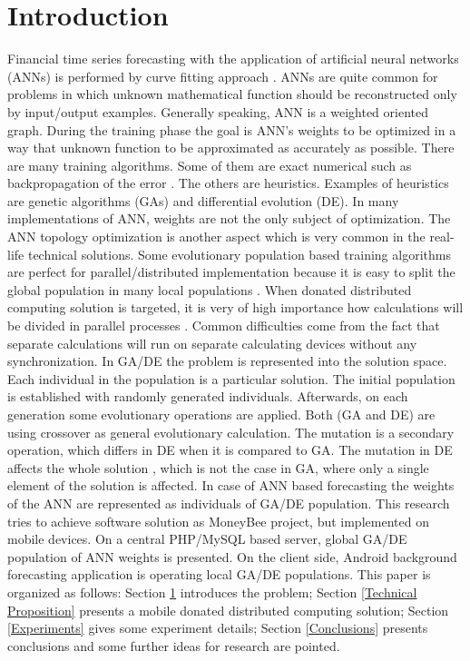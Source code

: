 \documentclass{llncs}
\begin{document}

\section{Introduction} \label{Introduction}

Financial time series forecasting with the application of artificial neural networks (ANNs) is performed by curve fitting approach \cite{atanasova01}. ANNs are quite common for problems in which unknown mathematical function should be reconstructed only by input/output examples. Generally speaking, ANN is a weighted oriented graph. During the training phase the goal is ANN's weights to be optimized in a way that unknown function to be approximated as accurately as possible. There are many training algorithms. Some of them are exact numerical such as backpropagation of the error \cite{zankinski01}. The others are heuristics. Examples of heuristics are genetic algorithms (GAs) and differential evolution (DE). In many implementations of ANN, weights are not the only subject of optimization. The ANN topology optimization \cite{zankinski02} is another aspect which is very common in the real-life technical solutions. Some evolutionary population based training algorithms are perfect for parallel/distributed implementation because it is easy to split the global population in many local populations \cite{balabanov03}. When donated distributed computing solution is targeted, it is very of high importance how calculations will be divided in parallel processes \cite{balabanov04}. Common difficulties come from the fact that separate calculations will run on separate calculating devices without any synchronization. In GA/DE the problem is represented into the solution space. Each individual in the population is a particular solution. The initial population is established with randomly generated individuals. Afterwards, on each generation some evolutionary operations are applied. Both (GA and DE) are using crossover as general evolutionary calculation. The mutation is a secondary operation, which differs in DE when it is compared to GA. The mutation in DE affects the whole solution \cite{tomov01}, which is not the case in GA, where only a single element of the solution is affected. In case of ANN based forecasting the weights of the ANN are represented as individuals of GA/DE population. This research tries to achieve software solution as MoneyBee project, but implemented on mobile devices. On a central PHP/MySQL based server, global GA/DE population of ANN weights is presented. On the client side, Android background forecasting application is operating local GA/DE populations. This paper is organized as follows: Section \ref{Introduction} introduces the problem; Section \ref{Technical Proposition} presents a mobile donated distributed computing solution; Section \ref{Experiments} gives some experiment details; Section \ref{Conclusions} presents conclusions and some further ideas for research are pointed.
\end{document}
